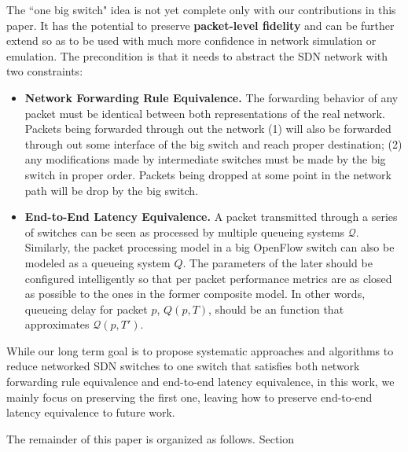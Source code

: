 The ``one big switch" idea is not yet complete only with our contributions in this paper.
It has the potential to preserve \textbf{packet-level fidelity} and
can be further extend so as to be used with much more confidence in network
simulation or emulation.
The precondition is that it needs to abstract the SDN network with two constraints:
\begin{itemize}
\item \textbf{Network Forwarding Rule Equivalence.}
        The forwarding behavior of any packet must be identical
        between both representations of the real network. Packets being
        forwarded through out the network (1) will also be forwarded through out
        some interface of the big switch and reach proper destination;
        (2) any modifications made by intermediate switches must be made by the
        big switch in proper order.
        Packets being dropped at some point in the network path will be drop by the
        big switch.
\item \textbf{End-to-End Latency Equivalence.}
        A packet transmitted through a series of
        switches can be seen as processed by multiple queueing systems $\mathcal{Q}$.
        Similarly, the packet processing model in a big OpenFlow switch can
        also be modeled as a queueing system $Q$.
        The parameters of the later should be configured intelligently
        so that per packet performance metrics are as closed as possible to the ones
        in the former composite model.
        In other words, queueing delay for packet $p$, $Q(p, T)$, should be an
        function that approximates $\mathcal{Q}(p, T')$.
\end{itemize}

While our long term goal is to propose systematic approaches and algorithms to reduce
networked SDN switches to one switch that satisfies both network forwarding rule equivalence
and end-to-end latency equivalence, in this work, we mainly focus on preserving the first one,
leaving how to preserve end-to-end latency equivalence to future work.

The remainder of this paper is organized as follows. Section 

